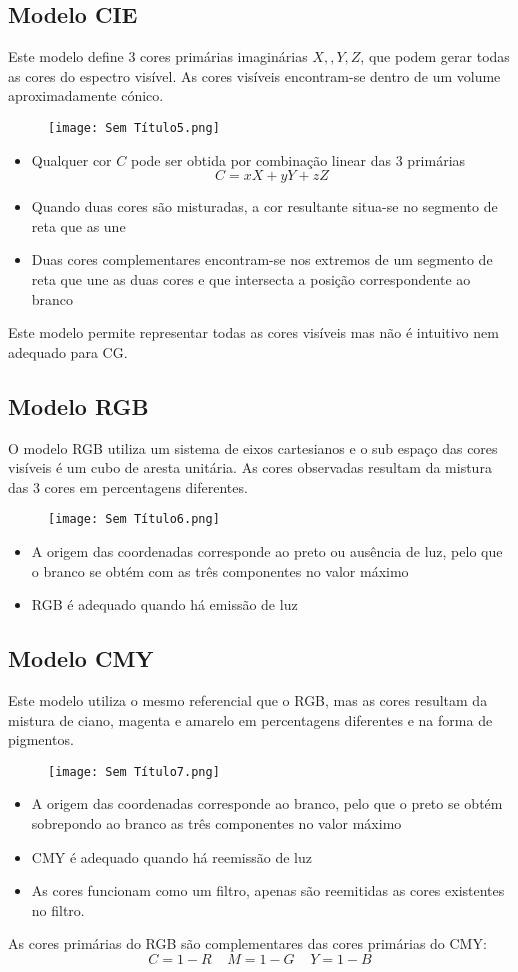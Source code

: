 \documentclass[10pt,a4paper]{report}
\begin{document}
\subsection{Modelo CIE}
Este modelo define 3 cores primárias imaginárias $X,, Y, Z$, que podem gerar todas as cores do espectro visível. As cores visíveis encontram-se dentro de um volume aproximadamente cónico.
\begin{figure}[H]
\centering
\texttt{[image: Sem Título5.png]}
\end{figure}
\begin{itemize}
\item Qualquer cor $C$ pode ser obtida por combinação linear das 3 primárias
$$
C = xX + yY + zZ
$$
\item Quando duas cores são misturadas, a cor resultante situa-se no segmento de reta que as une
\item Duas cores complementares encontram-se nos extremos de um segmento de reta que une as duas cores e que intersecta a posição correspondente ao branco
\end{itemize}
Este modelo permite representar todas as cores visíveis mas não é intuitivo nem adequado para CG.
\subsection{Modelo RGB}
O modelo RGB utiliza um sistema de eixos cartesianos e o sub espaço das cores visíveis é um cubo de aresta unitária. As cores observadas resultam da mistura das 3 cores em percentagens diferentes.
\begin{figure}[H]
\centering
\texttt{[image: Sem Título6.png]}
\end{figure}
\begin{itemize}
\item A origem das coordenadas corresponde ao preto ou ausência de luz, pelo que o branco se obtém com as três componentes no valor máximo
\item RGB é adequado quando há emissão de luz
\end{itemize}
\subsection{Modelo CMY}
Este modelo utiliza o mesmo referencial que o RGB, mas as cores resultam da mistura de ciano, magenta e amarelo em percentagens diferentes e na forma de pigmentos.
\begin{figure}[H]
\centering
\texttt{[image: Sem Título7.png]}
\end{figure}
\begin{itemize}
\item A origem das coordenadas corresponde ao branco, pelo que o preto se obtém sobrepondo ao branco as três componentes no valor máximo
\item CMY é adequado quando há reemissão de luz
\item As cores funcionam como um filtro, apenas são reemitidas as cores existentes no filtro.
\end{itemize}
As cores primárias do RGB são complementares das cores primárias do CMY:
$$
C = 1 - R \;\;\;\; M = 1 - G \;\;\;\; Y = 1 - B
$$
\end{document}
